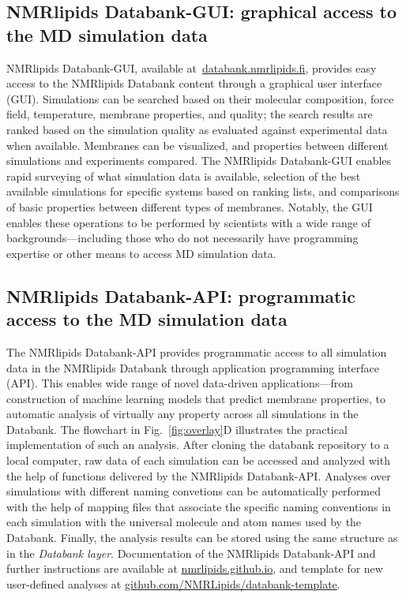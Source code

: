 \documentclass[fleqn,10pt]{wlscirep}
\begin{document}
\subsection{NMRlipids Databank-GUI: graphical access to the MD simulation data}
NMRlipids Databank-GUI, available at~\href{https://www.databank.nmrlipids.fi}{databank.nmrlipids.fi}, provides easy access to the NMRlipids Databank content through a graphical user interface (GUI). Simulations can be searched based on their molecular composition, force field, temperature, membrane properties, and quality; the search results are ranked based on the simulation quality as evaluated against experimental data when available. Membranes can be visualized, and properties between different simulations and experiments compared. The NMRlipids Databank-GUI enables rapid surveying of what simulation data is available, selection of the best available simulations for specific systems based on ranking lists, and comparisons of basic properties between different types of membranes. Notably, the GUI enables these operations to be performed by scientists with a wide range of backgrounds---including those who do not necessarily have programming expertise or other means to access MD simulation data. 

\subsection{NMRlipids Databank-API: programmatic access to the MD simulation data}\label{section:access}
The NMRlipids Databank-API provides programmatic access to all simulation data in the NMRlipids Databank through application programming interface (API). This enables wide range of novel data-driven applications---from construction of machine learning models that predict membrane properties, to automatic analysis of virtually any property across all simulations in the Databank. The flowchart in Fig.~\ref{fig:overlay}D illustrates the practical implementation of such an analysis. After cloning the databank repository to a local computer, raw data of each simulation can be accessed and analyzed with the help of functions delivered by the NMRlipids Databank-API. 
Analyses over simulations with different naming convetions can be automatically performed with the help of mapping files that associate the specific naming conventions in each simulation with the universal molecule and atom names used by the Databank. Finally, the analysis results can be stored using the same structure as in the {\it Databank layer}. Documentation of the NMRlipids Databank-API and further instructions are available at \href{https://nmrlipids.github.io/}{nmrlipids.github.io}, and template for new user-defined analyses at \href{https://github.com/NMRLipids/databank-template}{github.com/NMRLipids/databank-template}.
\end{document}
